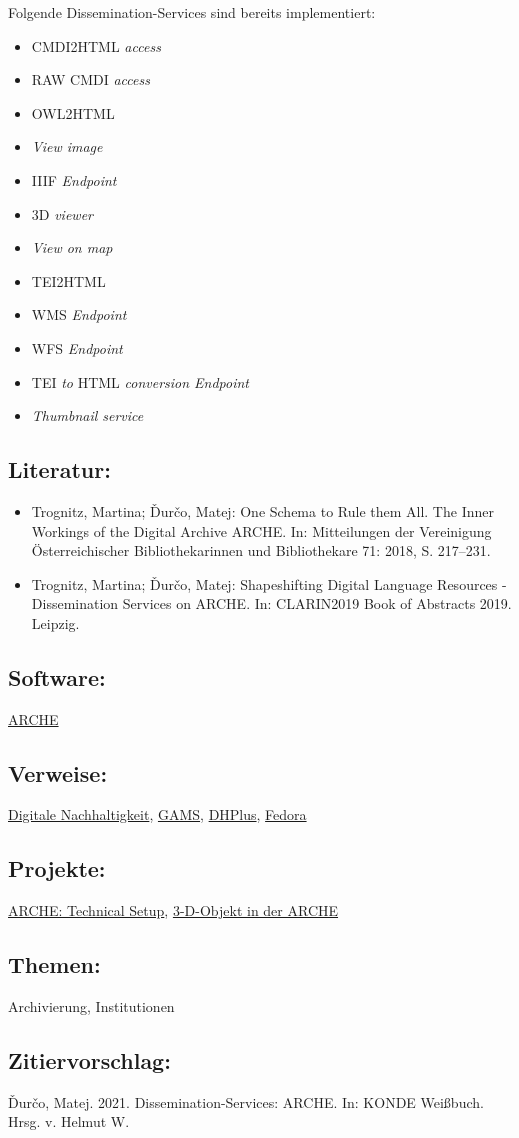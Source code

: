 \documentclass{article}
\begin{document}
        Folgende Dissemination-Services sind bereits implementiert:\\
            
        \begin{itemize}\item {CMDI2HTML \emph{access}}\item {RAW CMDI \emph{access}}\item {OWL2HTML}\item {\emph{View image}}\item {IIIF \emph{Endpoint}}\item {3D \emph{viewer}}\item {\emph{View on map}}\item {TEI2HTML}\item {WMS \emph{Endpoint}}\item {WFS \emph{Endpoint}}\item {TEI \emph{to} HTML \emph{conversion Endpoint}}\item {\emph{Thumbnail service}}\end{itemize}\subsection*{Literatur:}\begin{itemize}\item Trognitz, Martina; Ďurčo, Matej: One Schema to Rule them All. The Inner Workings of the Digital Archive ARCHE. In: Mitteilungen der Vereinigung Österreichischer Bibliothekarinnen und Bibliothekare 71: 2018, S. 217–231.\item Trognitz, Martina; Ďurčo, Matej: Shapeshifting Digital Language Resources - Dissemination Services on ARCHE. In: CLARIN2019 Book of Abstracts 2019. Leipzig.\end{itemize}\subsection*{Software:}\href{arche.acdh.oeaw.ac.at/}{ARCHE}\subsection*{Verweise:}\href{https://gams.uni-graz.at/o:konde.6}{Digitale Nachhaltigkeit}, \href{https://gams.uni-graz.at/o:konde.70}{GAMS}, \href{https://gams.uni-graz.at/o:konde.68}{DHPlus}, \href{https://gams.uni-graz.at/o:konde.69}{Fedora}\subsection*{Projekte:}\href{https://arche.acdh.oeaw.ac.at/browser/technical-setup}{ARCHE: Technical Setup}, \href{https://arche.acdh.oeaw.ac.at/browser/oeaw_detail/45647}{3-D-Objekt in der ARCHE}\subsection*{Themen:}Archivierung, Institutionen\subsection*{Zitiervorschlag:}Ďurčo, Matej. 2021. Dissemination-Services: ARCHE. In: KONDE Weißbuch. Hrsg. v. Helmut W. 
\end{document}
